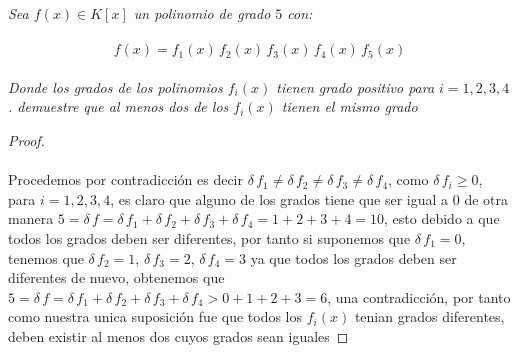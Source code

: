 \documentclass[11pt,letterpaper]{article}
\begin{document}
\begin{tcolorbox}[
	title = \textcolor{black}{\textcolor{white}{Problema 2}},]
\textit{Sea $f(x)\in K[x]$ un polinomio de grado $5$ con:\,\\
\,\\
\begin{equation*}
    f(x)=f_1(x)\,f_2(x)\,f_3(x)\,f_4(x)\,f_5(x)
\end{equation*}\,\\
Donde los grados de los polinomios $f_i(x)$ tienen grado positivo para $i=1,2,3,4$. demuestre que al menos 
dos de los $f_i(x)$ tienen el mismo grado
}
\end{tcolorbox}
\begin{proof}\,\\
    \,\\
    Procedemos por contradicci\'on es decir $\delta\,f_1\neq\delta\,f_2\neq\delta\,f_3\neq\delta\,f_4$, como $\delta\,f_i\geq 0$, para $i=1,2,3,4$, es claro que
    alguno de los grados tiene que ser igual a $0$ de otra manera $5=\delta\,f=\delta\,f_1+\delta\,f_2+\delta\,f_3+\delta\,f_4=1+2+3+4=10$, esto debido a que todos los
    grados deben ser diferentes, por tanto si suponemos que $\delta\,f_1=0$, tenemos que $\delta\,f_2=1$, $\delta\,f_3=2$, $\delta\,f_4=3$ ya que todos los grados
    deben ser diferentes de nuevo, obtenemos que $5=\delta\,f=\delta\,f_1+\delta\,f_2+\delta\,f_3+\delta\,f_4>0+1+2+3=6$, una contradicci\'on, por tanto como nuestra unica suposici\'on fue que
    todos los $f_i(x)$ tenian grados diferentes, deben existir al menos dos cuyos grados sean iguales
\end{proof}\,\\
\end{document}
